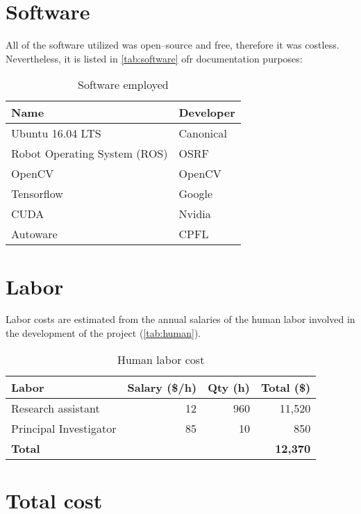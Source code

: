 \section{Software}
All of the software utilized was open--source and free, therefore it was costless. Nevertheless, it is listed in \autoref{tab:software} ofr documentation purposes:
\begin{table}[h!]
  \centering
  \begin{tabular}{ll}
    \hline
    \textbf{Name}                & \textbf{Developer} \\ \hline
    Ubuntu 16.04 LTS             & Canonical          \\
    Robot Operating System (ROS) & OSRF               \\
    OpenCV                       & OpenCV             \\
    Tensorflow                   & Google             \\
    CUDA                         & Nvidia             \\
    Autoware                     & CPFL               \\ \hline
  \end{tabular}
  \caption{Software employed}
  \label{tab:software}
\end{table}

\section{Labor}

Labor costs are estimated from the annual salaries of the human labor involved in the development of the project (\autoref{tab:human}).
\begin{table}[h!]
  \centering
  \begin{tabular}{lrrr}
    \hline
    \textbf{Labor} & \textbf{Salary (\$/h)} & \textbf{Qty (h)} & \textbf{Total (\$)} \\ \hline
    Research assistant     & 12 & 960 & 11,520          \\
    Principal Investigator & 85 & 10  & 850             \\ \hline
    \textbf{Total}         &    &     & \textbf{12,370} \\ \hline
  \end{tabular}
  \caption{Human labor cost}
  \label{tab:human}
\end{table}

\section{Total cost}

